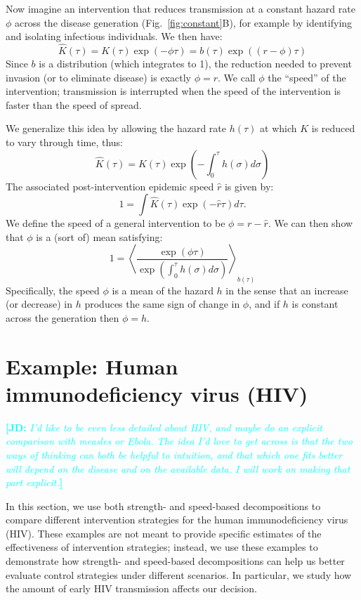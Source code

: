 \documentclass[12pt]{article}
\newcommand{\comment}[3]{\textcolor{#1}{\textbf{[#2: }\textit{#3}\textbf{]}}}
\newcommand{\jd}[1]{\comment{cyan}{JD}{#1}}
\newcommand{\figref}[1]{Fig.~\ref{fig:#1}}
\newcommand{\eqlab}[1]{\label{eq:#1}}
\begin{document}
Now imagine an intervention that reduces transmission at a constant hazard rate $\phi$ across the disease generation (\figref{constant}B), for example by identifying and isolating infectious individuals.
We then have:
\begin{equation}
	\hat K(\tau) = K(\tau)\exp(-\phi\tau) = b(\tau)\exp((r-\phi)\tau)
\end{equation}
Since $b$ is a distribution (which integrates to 1), the reduction needed to prevent invasion (or to eliminate disease)  is exactly $\phi=r$. 
We call $\phi$ the ``speed'' of the intervention; transmission is interrupted when the speed of the intervention is faster than the speed of spread.

We generalize this idea by allowing the hazard rate $h(\tau)$ at which $K$ is reduced to vary through time, thus:
\begin{equation}
	\hat K(\tau) = K(\tau) \exp\left(-\int_0^\tau h(\sigma) d\sigma\right)
\end{equation}
The associated post-intervention epidemic speed $\hat r$ is given by:
\begin{equation}
	1 = \int \hat K(\tau) \exp(-\hat r\tau) d\tau.	
\end{equation}
We define the speed of a general intervention to be $\phi = r - \hat r$. 
We can then show that $\phi$ is a (sort of) mean satisfying:
\begin{equation}
	1 = \left\langle \frac{\exp(\phi \tau) }{\exp\left(\int_0^\tau h(\sigma) d\sigma\right)} \right\rangle_{b(\tau)}
	\eqlab{speedMean}
\end{equation}
Specifically, the speed $\phi$ is a mean of the hazard $h$ in the sense that an increase (or decrease) in $h$ produces the same sign of change in $\phi$, and if $h$ is constant across the generation then $\phi=h$.

\section{Example: Human immunodeficiency virus (HIV)}

\jd{I'd like to be even less detailed about HIV, and maybe do an explicit comparison with measles or Ebola. The idea I'd love to get across is that the two ways of thinking can both be helpful to intuition, and that which one fits better will depend on the disease and on the available data. I will work on making that part explicit.}

In this section, we use both strength- and speed-based decompositions to compare different intervention strategies for the human immunodeficiency virus (HIV). 
These examples are not meant to provide specific estimates of the effectiveness of intervention strategies; 
instead, we use these examples to demonstrate how strength- and speed-based decompositions can help us better evaluate control strategies under different scenarios.
In particular, we study how the amount of early HIV transmission affects our decision.
\end{document}
